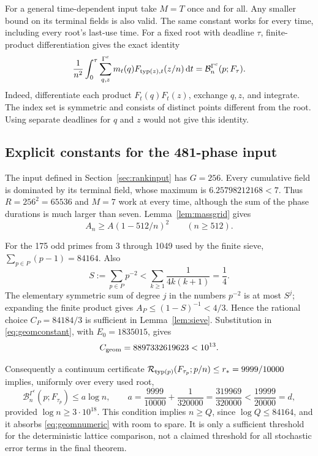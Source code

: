 For a general time-dependent input take \(M=T\) once and for all.
Any smaller bound on its terminal fields is also valid. The same
constant works for every time, including every root's last-use time.
For a fixed root with deadline \(\tau\), finite-product differentiation
gives the exact identity
\begin{equation}\label{eq:timesym}
 \frac1{n^2}\int_0^\tau\sum_{q,z}^{\Gamma^c}m_t(q)F_{\operatorname{typ}(z),t}(z/n)\,\mathrm d t
 =\mathcal B_n^{\Gamma^c}(p;F_\tau).
\end{equation}
Indeed, differentiate each product \(F_t(q)F_t(z)\), exchange \(q,z\),
and integrate. The index set is symmetric and consists of distinct
points different from the root. Using separate deadlines for \(q\)
and \(z\) would not give this identity.

\subsection{Explicit constants for the 481-phase input}\label{sec:uniform481}
The input defined in Section~\ref{sec:rankinput} has \(G=256\).
Every cumulative field is dominated by its terminal field, whose
maximum is \(6.25798212168<7\). Thus \(R=256^2=65536\) and \(M=7\)
work at every time, although the sum of the phase durations is much
larger than seven. Lemma~\ref{lem:massgrid} gives
\[
 A_n\ge A(1-512/n)^2\qquad(n\ge512).
\]

For the 175 odd primes from 3 through 1049 used by the finite sieve,
\(\sum_{p\in P}(p-1)=84164\). Also
\[
 S:=\sum_{p\in P}p^{-2}<\sum_{k\ge1}\frac1{4k(k+1)}=\frac14.
\]
The elementary symmetric sum of degree \(j\) in the numbers \(p^{-2}\)
is at most \(S^j\); expanding the finite product gives
\(A_P\le(1-S)^{-1}<4/3\). Hence the rational choice
\(C_P=84184/3\) is sufficient in Lemma~\ref{lem:sieve}. Substitution
in \eqref{eq:geomconstant}, with \(E_0=1835015\), gives
\begin{equation}\label{eq:geomnumeric}
 C_{\rm geom}=8897332619623<10^{13}.
\end{equation}

Consequently a continuum certificate
\(\mathcal R_{\operatorname{typ}(p)}(F_{\tau_p};p/n)\le r_*=9999/10000\)
implies, uniformly over every used root,
\begin{equation}\label{eq:discrete481}
 \mathcal B_n^{\Gamma^c}(p;F_{\tau_p})\le a\log n,
 \qquad a=\frac{9999}{10000}+\frac1{320000}
          =\frac{319969}{320000}<\frac{19999}{20000}=d,
\end{equation}
provided \(\log n\ge3\cdot10^{18}\). This condition implies
\(n\ge Q\), since \(\log Q\le84164\), and it absorbs
\eqref{eq:geomnumeric} with room to spare. It is only a sufficient
threshold for the deterministic lattice comparison, not a claimed
threshold for all stochastic error terms in the final theorem.

